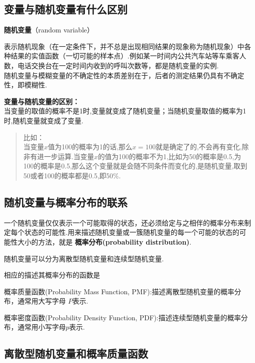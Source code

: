 \subsection{变量与随机变量有什么区别}\label{ux53d8ux91cfux4e0eux968fux673aux53d8ux91cfux6709ux4ec0ux4e48ux533aux522b}

\textbf{随机变量}（random variable）

表示随机现象（在一定条件下，并不总是出现相同结果的现象称为随机现象）中各种结果的实值函数（一切可能的样本点）.例如某一时间内公共汽车站等车乘客人数，电话交换台在一定时间内收到的呼叫次数等，都是随机变量的实例.\\
​随机变量与模糊变量的不确定性的本质差别在于，后者的测定结果仍具有不确定性，即模糊性.

\textbf{变量与随机变量的区别：}\\
​当变量的取值的概率不是1时,变量就变成了随机变量；当随机变量取值的概率为1时,随机变量就变成了变量.

\begin{quote}
比如：\\
​
当变量\(x\)值为100的概率为1的话,那么\(x=100\)就是确定了的,不会再有变化,除非有进一步运算.
​
当变量\(x\)的值为100的概率不为1,比如为50的概率是0.5,为100的概率是0.5,那么这个变量就是会随不同条件而变化的,是随机变量,取到50或者100的概率都是0.5,即50\%.
\end{quote}

\subsection{随机变量与概率分布的联系}\label{ux968fux673aux53d8ux91cfux4e0eux6982ux7387ux5206ux5e03ux7684ux8054ux7cfb}

一个随机变量仅仅表示一个可能取得的状态，还必须给定与之相伴的概率分布来制定每个状态的可能性.用来描述随机变量或一簇随机变量的每一个可能的状态的可能性大小的方法，就是
\textbf{概率分布(probability distribution)}.

随机变量可以分为离散型随机变量和连续型随机变量.

相应的描述其概率分布的函数是

概率质量函数(Probability Mass Function,
PMF):描述离散型随机变量的概率分布，通常用大写字母 \(P\)表示.

概率密度函数(Probability Density Function,
PDF):描述连续型随机变量的概率分布，通常用小写字母\(p\)表示.

\subsection{离散型随机变量和概率质量函数}\label{ux79bbux6563ux578bux968fux673aux53d8ux91cfux548cux6982ux7387ux8d28ux91cfux51fdux6570}

